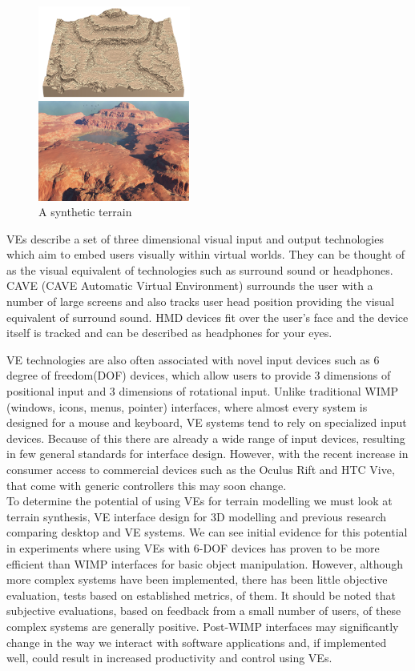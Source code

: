 \documentclass{sig-alternate-05-2015}
\begin{document}
\begin{figure}[H]
	\centering
	\includegraphics[width=5cm]{Terrain2}
	\caption{A synthetic terrain}
\end{figure} 
VEs describe a set of three dimensional visual input and output technologies which aim to embed users visually within virtual worlds. They can be thought of as the visual equivalent of technologies such as surround sound or headphones. CAVE (CAVE Automatic Virtual
Environment) surrounds the user with a number of large screens and also tracks user head position\cite{Cruz-Neira1993} providing the visual equivalent of surround sound. HMD devices fit over the user's face and the device itself is tracked and can be described as headphones for your eyes.\cite{Alger2015}

VE technologies are also often associated with novel input devices such as 6 degree of freedom(DOF) devices, which allow users to provide 3 dimensions of positional input and 3 dimensions of rotational input. Unlike traditional WIMP (windows, icons, menus, pointer) interfaces, where almost every system is designed for a mouse and keyboard, VE systems tend to rely on specialized input devices\cite{Hand1997,Bowman2001}. Because of this there are already a wide range of input devices, resulting in few general standards for interface design. However, with the recent increase in consumer access to commercial devices such as the Oculus Rift and HTC Vive, that come with generic controllers this may soon change.\\

To determine the potential of using VEs for terrain modelling  we must look at terrain synthesis, VE interface design for 3D modelling and previous research comparing desktop and VE systems. We can see initial evidence for this potential in experiments where using VEs with 6-DOF devices has proven to be more efficient than WIMP interfaces for basic object manipulation\cite{Schultheis2012,Scali2003}. However, although more complex systems have been implemented, there has been little objective evaluation, tests based on established metrics, of them. It should be noted that subjective evaluations, based on feedback from a small number of users, of these complex systems are generally positive\cite{Wang2013,Mine2014,Jerald2013}. Post-WIMP interfaces may significantly change in the way we interact with software applications and, if implemented well, could result in increased productivity and control using VEs.
 
\end{document}
